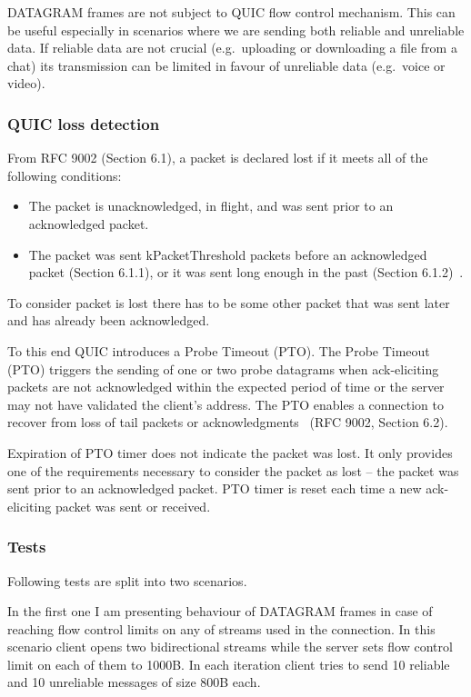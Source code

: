 DATAGRAM frames are not subject to QUIC flow control mechanism.
This can be useful especially in scenarios where we are sending both reliable and unreliable data.
If reliable data are not crucial (e.g.\ uploading or downloading a file from a chat) its transmission can be limited in favour of unreliable data (e.g.\ voice or video).

\subsubsection{QUIC loss detection}
\label{subsubsec:loss-detection}
From RFC 9002 (Section 6.1), a packet is declared lost if it meets all of the following conditions:
\begin{itemize}
    \item The packet is unacknowledged, in flight, and was sent prior to an acknowledged packet.
    \item The packet was sent kPacketThreshold packets before an acknowledged packet (Section 6.1.1), or it was sent long enough in the past (Section 6.1.2)~\cite{rfc9002}.
\end{itemize}

To consider packet is lost there has to be some other packet that was sent later and has already been acknowledged.

To this end QUIC introduces a Probe Timeout (PTO).
The Probe Timeout (PTO) triggers the sending of one or two probe datagrams when ack-eliciting packets are not acknowledged within the expected period of time or the server may not have validated the client's address.
The PTO enables a connection to recover from loss of tail packets or acknowledgments~\cite{rfc9002} (RFC 9002, Section 6.2).

Expiration of PTO timer does not indicate the packet was lost.
It only provides one of the requirements necessary to consider the packet as lost -- the packet was sent prior to an acknowledged packet.
PTO timer is reset each time a new ack-eliciting packet was sent or received.

\subsubsection{Tests}
\label{subsubsec:tests2}
Following tests are split into two scenarios.

In the first one I am presenting behaviour of DATAGRAM frames in case of reaching flow control limits on any of streams used in the connection.
In this scenario client opens two bidirectional streams while the server sets flow control limit on each of them to 1000B\@.
In each iteration client tries to send 10 reliable and 10 unreliable messages of size 800B each.

